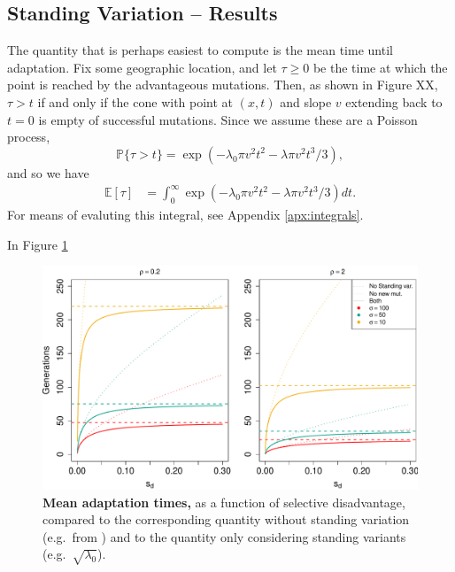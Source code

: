 \documentclass{article}
\renewcommand{\P}{\mathbb{P}}
\newcommand{\E}{\mathbb{E}}
\begin{document}


\subsection{Standing Variation -- Results} 

The quantity that is perhaps easiest to compute is the mean time until adaptation.
Fix some geographic location, and let $\tau\ge0$ be the time at which the point is reached by the advantageous mutations.
Then, as shown in Figure XX,
$\tau > t$ if and only if the cone with point at $(x,t)$ and slope $v$ extending back to $t=0$ is empty of successful mutations.
Since we assume these are a Poisson process, 
\[
    \P\{ \tau > t \} = \exp\left( - \lambda_0 \pi v^2 t^2 - \lambda \pi v^2 t^3 / 3 \right) ,
\]
and so we have
\begin{align}
    \E[\tau] %
        &= \int_0^\infty \exp\left( - \lambda_0 \pi v^2 t^2 - \lambda \pi v^2 t^3 / 3 \right) dt.
\end{align}
For means of evaluting this integral, see Appendix \ref{apx:integrals}.

In Figure \ref{G6PD_chartimes}

\begin{figure}[ht]
\begin{center}
  \includegraphics[width=1.0\textwidth]{G6PD_chartimes}   %
\caption{ %
{\bf Mean adaptation times,} as a function of selective disadvantage, compared to the corresponding quantity without standing variation (e.g.\ from \cite{ralphcoop2010}) and to the quantity only considering standing variants (e.g.\ $\sqrt{\lambda_0}$).
} \label{G6PD_chartimes}
\end{center}
\end{figure}
\end{document}
